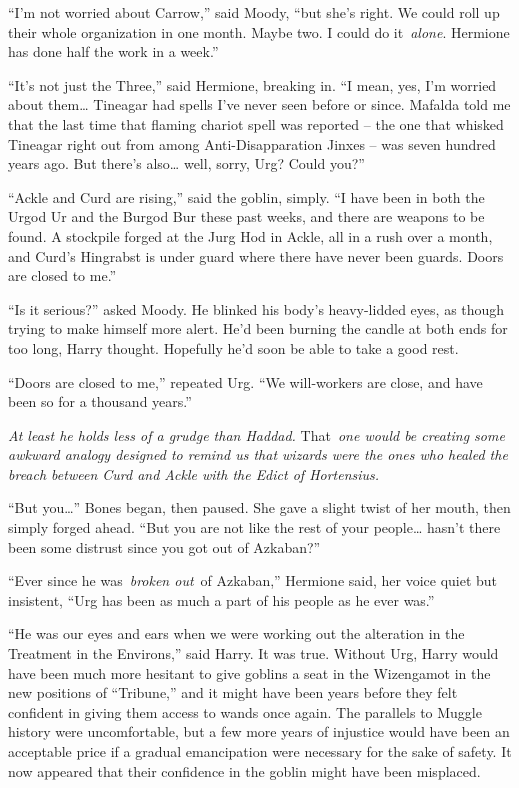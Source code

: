 ``I'm not worried about Carrow,'' said Moody, ``but she's right. We
could roll up their whole organization in one month. Maybe two. I could
do it~\emph{alone}. Hermione has done half the work in a week.''

``It's not just the Three,'' said Hermione, breaking in. ``I mean, yes,
I'm worried about them\ldots{} Tineagar had spells I've never seen
before or since. Mafalda told me that the last time that flaming chariot
spell was reported -- the one that whisked Tineagar right out from among
Anti-Disapparation Jinxes -- was seven hundred years ago. But there's
also\ldots{} well, sorry, Urg? Could you?''

``Ackle and Curd are rising,'' said the goblin, simply. ``I have been in
both the Urgod Ur and the Burgod Bur these past weeks, and there are
weapons to be found. A stockpile forged at the Jurg Hod in Ackle, all in
a rush over a month, and Curd's Hingrabst is under guard where there
have never been guards. Doors are closed to me.''

``Is it serious?'' asked Moody. He blinked his body's heavy-lidded eyes,
as though trying to make himself more alert. He'd been burning the
candle at both ends for too long, Harry thought. Hopefully he'd soon be
able to take a good rest.

``Doors are closed to me,'' repeated Urg. ``We will-workers are close,
and have been so for a thousand years.''

\emph{At least he holds less of a grudge than Haddad.} That~\emph{one
would be creating some awkward analogy designed to remind us that
wizards were the ones who healed the breach between Curd and Ackle with
the Edict of Hortensius.}

``But you\ldots{}'' Bones began, then paused. She gave a slight twist of
her mouth, then simply forged ahead. ``But you are not like the rest of
your people\ldots{} hasn't there been some distrust since you got out of
Azkaban?''

``Ever since he was~\emph{broken out}~of Azkaban,'' Hermione said, her
voice quiet but insistent, ``Urg has been as much a part of his people
as he ever was.''

``He was our eyes and ears when we were working out the alteration in
the Treatment in the Environs,'' said Harry. It was true. Without Urg,
Harry would have been much more hesitant to give goblins a seat in the
Wizengamot in the new positions of ``Tribune,'' and it might have been
years before they felt confident in giving them access to wands once
again. The parallels to Muggle history were uncomfortable, but a few
more years of injustice would have been an acceptable price if a gradual
emancipation were necessary for the sake of safety. It now appeared that
their confidence in the goblin might have been misplaced.

